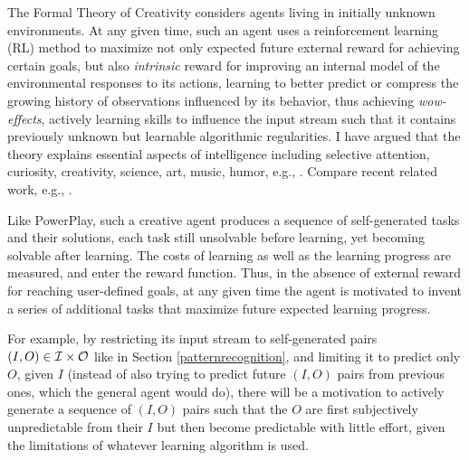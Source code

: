 \documentclass{article}
\begin{document}
The Formal Theory of Creativity \cite{Schmidhuber:06cs,Schmidhuber:10ieeetamd}
considers agents living in initially unknown environments. At any given time, 
such an agent uses a reinforcement learning (RL) method \cite{Kaelbling:96} to 
maximize not only expected future external reward for achieving certain goals,
but also {\em intrinsic} reward for improving an internal model of the environmental responses
to its actions,
learning to better predict or compress the growing history of observations
influenced by its behavior,
thus achieving {\em wow-effects},
actively learning skills to influence the input stream such that it contains previously
unknown but learnable algorithmic regularities. 
I have argued that the theory explains essential aspects of intelligence 
including  selective attention, curiosity, creativity, 
science, art, music, humor, e.g.,
 \cite{Schmidhuber:06cs,Schmidhuber:10ieeetamd}.
Compare recent related work, e.g., 
  \cite{Barto:12intrinsic,Dayan:12intrinsic,Oudeyer:12intrinsic,Nemzhov:12intrinsic}.

Like {\sc PowerPlay}, such a creative agent  produces a sequence of self-generated
tasks and their solutions, each task still unsolvable before 
learning, yet becoming solvable after learning. 
The costs of learning as well as the learning progress are measured, 
and enter the reward function. Thus, in the absence of external reward for reaching
user-defined goals,
 at any given time the agent is motivated to 
invent a series of additional tasks that maximize future expected learning progress.

For example, by restricting its input stream to self-generated pairs $(I, O) \in \cal I \times \cal O$ like
in Section \ref{patternrecognition}, and limiting it to predict only $O$, given $I$
(instead of also trying to predict future $(I, O)$ pairs from previous ones, which the general agent would do),
there will be a motivation to actively generate a sequence of $(I, O)$ pairs such that the $O$ are first
subjectively unpredictable from their $I$ but then become predictable with little effort,
given the limitations of whatever learning algorithm is used.
\end{document}
